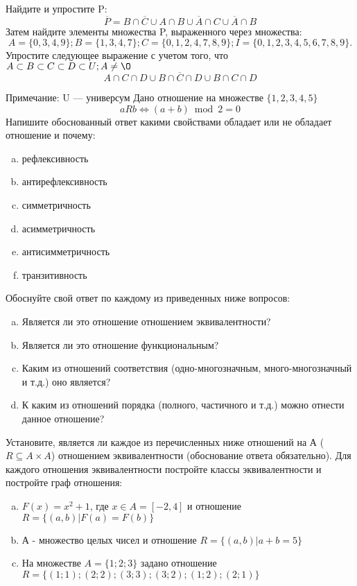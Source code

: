\documentclass[10pt]{exam}
\begin{document}
\begin{questions}
\question
Найдите и упростите P:
\begin{equation*}
\overline{P} = B \cap \overline{C} \cup A \cap B \cup \overline{A} \cap C \cup \overline{A} \cap B
\end{equation*}
Затем найдите элементы множества P, выраженного через множества:
\begin{equation*}
A = \{0, 3, 4, 9\}; 
B = \{1, 3, 4, 7\};
C = \{0, 1, 2, 4, 7, 8, 9\};
I = \{0, 1, 2, 3, 4, 5, 6, 7, 8, 9\}.
\end{equation*}\question
Упростите следующее выражение с учетом того, что $A\subset B \subset C \subset D \subset U; A \neq \O$
\begin{equation*}
A \cap C  \cap D \cup B \cap \overline{C} \cap D \cup B \cap C \cap D
\end{equation*}

Примечание: U — универсум\question
Дано отношение на множестве $\{1, 2, 3, 4, 5\}$ 
\begin{equation*}
aRb \iff (a+b) \bmod 2 =0
\end{equation*}
Напишите обоснованный ответ какими свойствами обладает или не обладает отношение и почему:   
\begin{enumerate} [a)]\setcounter{enumi}{0}
\item рефлексивность
\item антирефлексивность
\item симметричность
\item асимметричность
\item антисимметричность
\item транзитивность
\end{enumerate}

Обоснуйте свой ответ по каждому из приведенных ниже вопросов:
\begin{enumerate} [a)]\setcounter{enumi}{0}
    \item Является ли это отношение отношением эквивалентности?
    \item Является ли это отношение функциональным?
    \item Каким из отношений соответствия (одно-многозначным, много-многозначный и т.д.) оно является?
    \item К каким из отношений порядка (полного, частичного и т.д.) можно отнести данное отношение?
\end{enumerate}



\question
Установите, является ли каждое из перечисленных ниже отношений на А ($R \subseteq A \times A$) отношением эквивалентности (обоснование ответа обязательно). Для каждого отношения эквивалентности постройте классы эквивалентности и постройте граф отношения:
\begin{enumerate} [a)]\setcounter{enumi}{0}
\item $F(x)=x^{2}+1$, где $x \in A = [-2, 4]$ и отношение $R = \{(a,b)|F(a) = F(b)\}$
\item А - множество целых чисел и отношение $R = \{(a,b)|a + b = 5\}$
\item На множестве $A = \{1; 2; 3\}$ задано отношение $R = \{(1; 1); (2; 2); (3; 3); (3; 2); (1; 2); (2; 1)\}$


\end{enumerate}
\end{questions}
\end{document}
